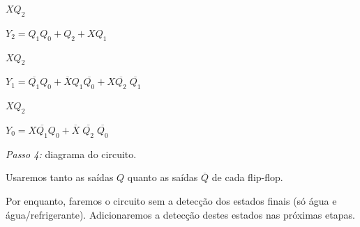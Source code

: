 \documentclass[a4paper,12pt,notitlepage]{article}
\def\Not#1{\overline{#1}}
\def\passo#1{\vspace{1ex}\noindent{}\emph{Passo #1:}}
\begin{document}
\noindent
\begin{minipage}{0.275\textwidth}
\begin{Karnaugh}{$X Q_2$}{}
\end{Karnaugh}

\vspace{-1.3\baselineskip}

$Y_2 = Q_1 Q_0 + Q_2 + X Q_1$

\end{minipage}%
\hfill
\begin{minipage}{0.33\textwidth}
\begin{Karnaugh}{$X Q_2$}{}
\end{Karnaugh}

\vspace{-1.3\baselineskip}

$Y_1 = \Not{Q_1} Q_0 + \Not{X} Q_1 \Not{Q_0} + X \Not{Q_2} \; \Not{Q_1}$

\end{minipage}%
\hfill
\begin{minipage}{0.33\textwidth}
\begin{Karnaugh}{$X Q_2$}{}
\end{Karnaugh}

\vspace{-1.3\baselineskip}

$Y_0 = X \Not{Q_1} Q_0 + \Not{X} \; \Not{Q_2} \; \Not{Q_0}$

\end{minipage}%

\passo{4} diagrama do circuito.

Usaremos tanto as saídas $Q$ quanto as saídas $\Not{Q}$ de cada flip-flop.

Por enquanto, faremos o circuito sem a detecção dos estados finais (só água
e água/re\-fri\-ge\-ran\-te). Adicionaremos a detecção destes estados nas
próximas etapas.
\end{document}
